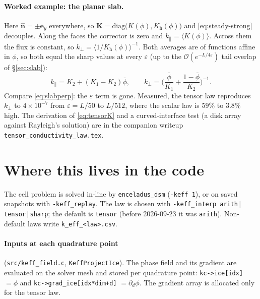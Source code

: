 \documentclass[11pt]{article}
\newcommand{\bn}{\hat{\mathbf n}}
\newcommand{\be}{\mathbf e}
\newcommand{\avg}[1]{\big\langle #1 \big\rangle}
\begin{document}
\paragraph{Worked example: the planar slab.} Here $\bn=\pm\be_y$ everywhere, so
$\mathbf K=\mathrm{diag}\big(K(\phi),K_{\mathrm h}(\phi)\big)$ and
\eqref{eq:steady-strong} decouples. Along the faces the corrector is zero and
$k_\parallel=\avg{K(\phi)}$. Across them the flux is constant, so
$k_\perp=\avg{1/K_{\mathrm h}(\phi)}^{-1}$. Both averages are of functions
affine in $\phi$, so both equal the sharp values at every $\varepsilon$
(up to the $\mathcal O(e^{-L/4\varepsilon})$ tail overlap of
\S\ref{sec:slab}):
\begin{equation}
k_\parallel=K_2+(K_1-K_2)\bar\phi,\qquad
k_\perp=\Big(\frac{\bar\phi}{K_1}+\frac{1-\bar\phi}{K_2}\Big)^{-1}.
\end{equation}
Compare \eqref{eq:slabperp}: the $\varepsilon$ term is gone. Measured, the
tensor law reproduces $k_\perp$ to $4\times10^{-7}$ from $\varepsilon=L/50$ to
$L/512$, where the scalar law is $59\%$ to $3.8\%$ high. The derivation of
\eqref{eq:tensorK} and a curved-interface test (a disk array against Rayleigh's
solution) are in the companion writeup
\verb|tensor_conductivity_law.tex|.

\section{Where this lives in the code}
\label{sec:code}

The cell problem is solved in-line by \verb|enceladus_dsm| (\verb|-keff 1|),
or on saved snapshots with \verb|-keff_replay|. The law is chosen with
\verb|-keff_interp arith|$\,|\,$\verb|tensor|$\,|\,$\verb|sharp|; the default is
\verb|tensor| (before 2026-09-23 it was \verb|arith|). Non-default laws write
\verb|k_eff_<law>.csv|.

\paragraph{Inputs at each quadrature point}
(\verb|src/keff_field.c|, \verb|KeffProjectIce|). The phase field and its
gradient are evaluated on the solver mesh and stored per quadrature point:
\verb|kc->ice[idx]| $=\phi$ and \verb|kc->grad_ice[idx*dim+d]|
$=\partial_d\phi$. The gradient array is allocated only for the tensor law.
\end{document}
